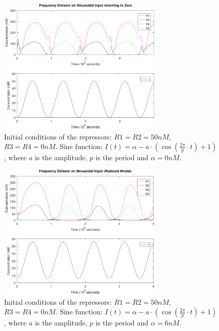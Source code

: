     \begin{figure}[!htbp]
      \centering
      \includegraphics[width=0.7\textwidth]{img/freqdiv-zero-1.png}
      \caption{Initial conditions of the repressors: $R1 = R2 = 50nM$, $R3 = R4 = 0nM$. Sine function: $I(t) = \alpha - a\cdot(\cos(\frac{2\pi}{p}\cdot t) + 1)$, where $a$ is the amplitude, $p$ is the period and $\alpha = 0nM$.}
      \label{fig.freqdiv-zero}
    \end{figure}

    \begin{figure}[!htbp]
      \centering
      \includegraphics[width=0.7\textwidth]{img/freqdiv-qssa-1.png}
      \caption{Initial conditions of the repressors: $R1 = R2 = 50nM$, $R3 = R4 = 0nM$. Sine function: $I(t) = \alpha - a\cdot(\cos(\frac{2\pi}{p}\cdot t) + 1)$, where $a$ is the amplitude, $p$ is the period and $\alpha = 6nM$.}
      \label{fig.freqdiv-qssa}
    \end{figure}

